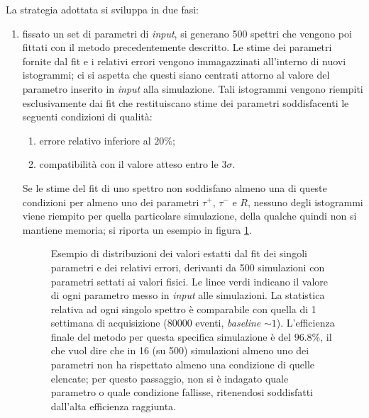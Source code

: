 \documentclass[10pt, oneside, a4paper]{article}   	%
\begin{document}
La strategia adottata si sviluppa in due fasi:
\begin{enumerate}
 \item fissato un set di parametri di \textit{input}, si generano 500 spettri che vengono poi fittati con il metodo precedentemente descritto. Le stime dei parametri fornite dal fit e i relativi errori vengono immagazzinati all'interno di nuovi istogrammi; ci si aspetta che questi siano centrati attorno al valore del parametro inserito in \textit{input} alla simulazione. Tali istogrammi vengono riempiti esclusivamente dai fit che restituiscano stime dei parametri soddisfacenti le seguenti condizioni di qualità:
 \begin{enumerate}
  \item errore relativo inferiore al $20\%$;
  \item compatibilità con il valore atteso entro le $3\sigma$. 
 \end{enumerate}
 Se le stime del fit di uno spettro non soddisfano almeno una di queste condizioni per almeno uno dei parametri $\tau^+$, $\tau^-$ e $R$, nessuno degli istogrammi viene riempito per quella particolare simulazione, della qualche quindi non si mantiene memoria; si riporta un esempio in figura \ref{fig::esempio_set_simulazioni}.
 \begin{figure}
  \centering
  \begin{adjustbox}{width=\linewidth}
  
  \end{adjustbox}
  \caption{Esempio di distribuzioni dei valori estatti dal fit dei singoli parametri e dei relativi errori, derivanti da 500 simulazioni con parametri settati ai valori fisici. Le linee verdi indicano il valore di ogni parametro messo in \textit{input} alle simulazioni. La statistica relativa ad ogni singolo spettro è comparabile con quella di 1 settimana di acquisizione ($ 80000$ eventi, \textit{baseline} $\sim 1$). L'efficienza finale del metodo per questa specifica simulazione è del $96.8\%$, il che vuol dire che in 16 (su 500) simulazioni almeno uno dei parametri non ha rispettato almeno una condizione di quelle elencate; per questo passaggio, non si è indagato quale parametro o quale condizione fallisse, ritenendosi soddisfatti dall'alta efficienza raggiunta.}
  \label{fig::esempio_set_simulazioni}
 \end{figure}
 

\end{enumerate}
\end{document}
